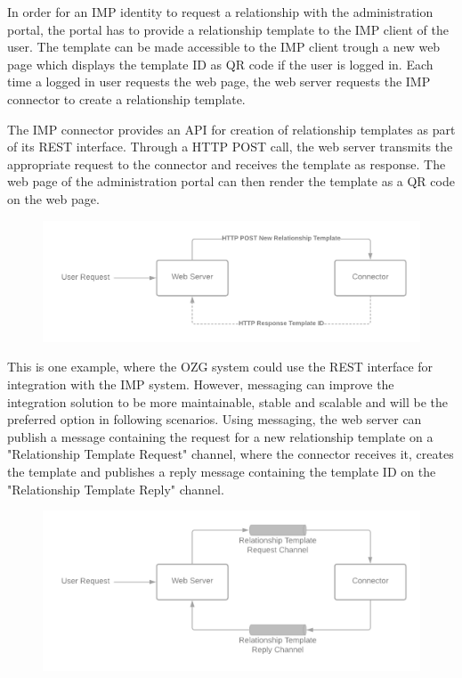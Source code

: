 \documentclass[
     12pt,         %
     a4paper,      %
     BCOR=10mm,version=first,     %
     DIV=14,version=first,        %
     ]{scrreprt}
\begin{document}
In order for an IMP identity to request a relationship with the administration portal, the portal has to provide a relationship template to the IMP client of the user. The template can be made accessible to the IMP client trough a new web page which displays the template ID as QR code if the user is logged in. Each time a logged in user requests the web page, the web server requests the IMP connector to create a relationship template.

The IMP connector provides an API for creation of relationship templates as part of its REST interface. Through a HTTP POST call, the web server transmits the appropriate request to the connector and receives the template as response. The web page of the administration portal can then render the template as a QR code on the web page.

\begin{figure}[h]
    \centering
    \includegraphics[scale=0.3]{Diagrams/Integration Architecture 1/Overview/Relationship Template REST.png}
\end{figure}

This is one example, where the OZG system could use the REST interface for integration with the IMP system. However, messaging can improve the integration solution to be more maintainable, stable and scalable and will be the preferred option in following scenarios. Using messaging, the web server can publish a message containing the request for a new relationship template on a "Relationship Template Request" channel, where the connector receives it, creates the template and publishes a reply message containing the template ID on the "Relationship Template Reply" channel.

\begin{figure}[h]
    \centering
    \includegraphics[scale=0.3]{Diagrams/Integration Architecture 1/Overview/Relationship Template Messaging.png}
\end{figure}
\end{document}
